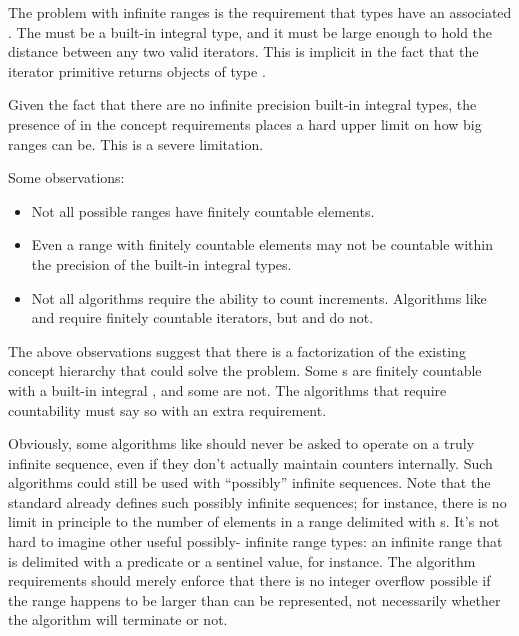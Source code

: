 \pnum
The problem with infinite ranges is the requirement that  types have an
associated . The  must be a built-in integral type, and
it must be large enough to hold the distance between any two valid iterators. This is implicit in
the fact that the  iterator primitive returns objects of type
.

\pnum
Given the fact that there are no infinite precision built-in integral types, the presence of
 in the concept requirements places a hard upper limit on how big ranges can
be. This is a severe limitation.

\pnum
Some observations:

\begin{itemize}
\item Not all possible ranges have finitely countable elements.
\item Even a range with finitely countable elements may not be countable within the precision of the
built-in integral types.
\item Not all algorithms require the ability to count increments. Algorithms like 
and  require finitely countable iterators, but  and  do
not.
\end{itemize}

\pnum
The above observations suggest that there is a factorization of the existing concept hierarchy
that could solve the problem. Some s are finitely countable with a built-in
integral , and some are not. The algorithms that require countability must
say so with an extra requirement.

\pnum
Obviously, some algorithms like  should never be asked to operate on a truly
infinite sequence, even if they don't actually maintain counters internally. Such algorithms could
still be used with ``possibly'' infinite sequences. Note that the standard already defines such
possibly infinite sequences; for instance, there is no limit in principle to the number of elements
in a range delimited with s. It's not hard to imagine other useful possibly-
infinite range types: an infinite range that is delimited with a predicate or a sentinel value, for
instance. The algorithm requirements should merely enforce that there is no integer overflow
possible if the range happens to be larger than can be represented, not necessarily whether the
algorithm will terminate or not.

